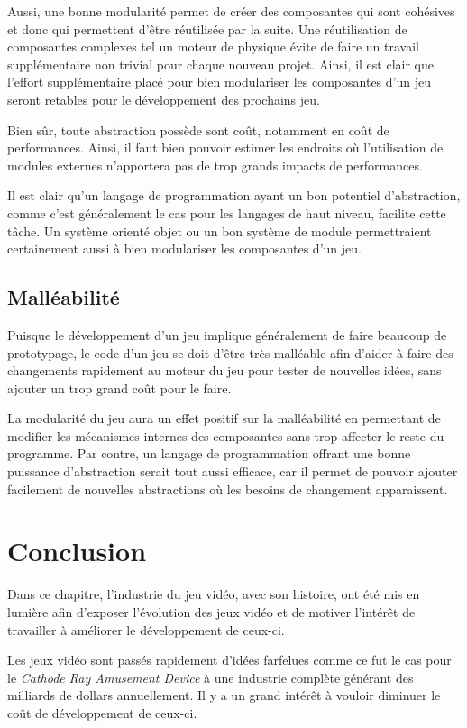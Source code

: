 \documentclass[12pt,oneside,letterpaper,francais]{book}
\begin{document}
Aussi, une bonne modularité permet de créer des composantes qui sont
cohésives et donc qui permettent d'être réutilisée par la suite. Une
réutilisation de composantes complexes tel un moteur de physique évite
de faire un travail supplémentaire non trivial pour chaque nouveau
projet. Ainsi, il est clair que l'effort supplémentaire placé pour
bien modulariser les composantes d'un jeu seront retables pour le
développement des prochains jeu.

Bien sûr, toute abstraction possède sont coût, notamment en coût de
performances. Ainsi, il faut bien pouvoir estimer les endroits où
l'utilisation de modules externes n'apportera pas de trop grands
impacts de performances.

Il est clair qu'un langage de programmation ayant un bon potentiel
d'abstraction, comme c'est généralement le cas pour les langages de
haut niveau, facilite cette tâche. Un système orienté objet ou un bon
système de module permettraient certainement aussi à bien modulariser
les composantes d'un jeu.

\subsection{Malléabilité}

Puisque le développement d'un jeu implique généralement de faire
beaucoup de prototypage, le code d'un jeu se doit d'être très
malléable afin d'aider à faire des changements rapidement au moteur du
jeu pour tester de nouvelles idées, sans ajouter un trop grand coût
pour le faire.

La modularité du jeu aura un effet positif sur la malléabilité en
permettant de modifier les mécanismes internes des composantes sans
trop affecter le reste du programme. Par contre, un langage de
programmation offrant une bonne puissance d'abstraction serait tout
aussi efficace, car il permet de pouvoir ajouter facilement de
nouvelles abstractions où les besoins de changement apparaissent.


\section{Conclusion}
Dans ce chapitre, l'industrie du jeu vidéo, avec son histoire, ont été
mis en lumière afin d'exposer l'évolution des jeux vidéo et de motiver
l'intérêt de travailler à améliorer le développement de ceux-ci.

Les jeux vidéo sont passés rapidement d'idées farfelues comme ce fut
le cas pour le \textit{Cathode Ray Amusement Device} à une industrie
complète générant des milliards de dollars annuellement. Il y a un
grand intérêt à vouloir diminuer le coût de développement de
ceux-ci. 
\end{document}
